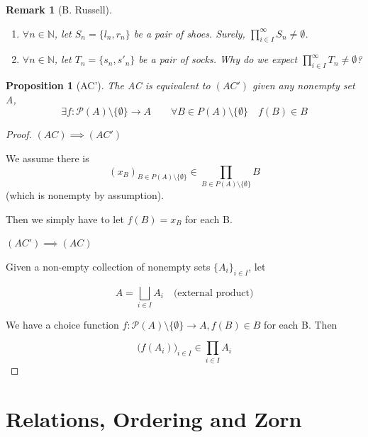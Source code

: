 \documentclass[11pt, oneside]{book}
\theoremstyle{break}
\newtheorem*{proof}{Proof}
\newtheorem{propo}{Proposition}[section]
\newtheorem*{remark}{Remark}
\newcommand{\bb}[1]{\mathbb{#1}}			%
\begin{document}
\begin{remark}[B. Russell]
	\begin{enumerate}
		\item $\forall n \in \bb{N}$, let $S_n = \{l_n, r_n\}$ be a pair of shoes. Surely, $\prod_{i \in I}^\infty S_n \neq \emptyset$.
		\item $\forall n \in \bb{N}$, let $T_n = \{s_n, s'_n\}$ be a pair of socks. Why do we expect $\prod_{i \in I}^\infty T_n \neq \emptyset$?
	\end{enumerate}
\end{remark}

\begin{propo}[AC']\label{axiom:ac2}
	The AC is equivalent to $(AC')$ given any nonempty set A,
	\begin{equation}
		\exists f:\mathcal{P}(A) \setminus \{\emptyset\} \to A \qquad \forall B \in P(A) \setminus \{\emptyset\} \quad f(B) \in B
	\end{equation}
\end{propo}

\begin{proof}
	$(AC) \implies (AC')$

	We assume there is
	\begin{equation}
		(x_B)_{B \in P(A)\setminus \{\emptyset\}} \in \prod_{B \in P(A) \setminus \{\emptyset\}} B
	\end{equation}
	(which is nonempty by assumption).

	Then we simply have to let $f(B) = x_B$ for each B.

	$(AC') \implies (AC)$

	Given a non-empty collection of nonempty sets $\{A_i\}_{i \in I}$, let

	\begin{equation}
		A = \bigsqcup_{i \in I} A_i \quad \text{(external product)}
	\end{equation}

	We have a choice function $f:\mathcal{P}(A) \setminus \{\emptyset\} \to A, f(B) \in B$ for each B. Then

	\begin{equation}
		\big(f(A_i)\big)_{i \in I} \in \prod_{i \in I} A_i
	\end{equation}
\end{proof}

\section{Relations, Ordering and Zorn}\label{sect:relations_ordering}
\end{document}
